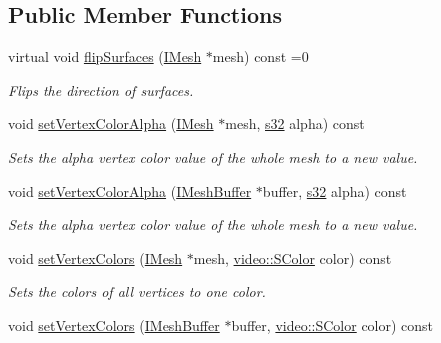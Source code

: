 \subsection*{Public Member Functions}
\begin{DoxyCompactItemize}
\item 
virtual void \hyperlink{classirr_1_1scene_1_1IMeshManipulator_a7194e8a44bfe3a6444826f346c4104ff}{flip\+Surfaces} (\hyperlink{classirr_1_1scene_1_1IMesh}{I\+Mesh} $\ast$mesh) const =0
\begin{DoxyCompactList}\small\item\em Flips the direction of surfaces. \end{DoxyCompactList}\item 
void \hyperlink{classirr_1_1scene_1_1IMeshManipulator_a96391fbe81aaddf8afa56b5b13da66e2}{set\+Vertex\+Color\+Alpha} (\hyperlink{classirr_1_1scene_1_1IMesh}{I\+Mesh} $\ast$mesh, \hyperlink{namespaceirr_ac66849b7a6ed16e30ebede579f9b47c6}{s32} alpha) const
\begin{DoxyCompactList}\small\item\em Sets the alpha vertex color value of the whole mesh to a new value. \end{DoxyCompactList}\item 
void \hyperlink{classirr_1_1scene_1_1IMeshManipulator_af69cbfcfd9286ccec2c6088a09dbe4a3}{set\+Vertex\+Color\+Alpha} (\hyperlink{classirr_1_1scene_1_1IMeshBuffer}{I\+Mesh\+Buffer} $\ast$buffer, \hyperlink{namespaceirr_ac66849b7a6ed16e30ebede579f9b47c6}{s32} alpha) const
\begin{DoxyCompactList}\small\item\em Sets the alpha vertex color value of the whole mesh to a new value. \end{DoxyCompactList}\item 
void \hyperlink{classirr_1_1scene_1_1IMeshManipulator_a72bc31cb9468480698277f0f164e71ee}{set\+Vertex\+Colors} (\hyperlink{classirr_1_1scene_1_1IMesh}{I\+Mesh} $\ast$mesh, \hyperlink{classirr_1_1video_1_1SColor}{video\+::\+S\+Color} color) const
\begin{DoxyCompactList}\small\item\em Sets the colors of all vertices to one color. \end{DoxyCompactList}\item 
void \hyperlink{classirr_1_1scene_1_1IMeshManipulator_ab13881bea577e0f0ffc03b102f29db6a}{set\+Vertex\+Colors} (\hyperlink{classirr_1_1scene_1_1IMeshBuffer}{I\+Mesh\+Buffer} $\ast$buffer, \hyperlink{classirr_1_1video_1_1SColor}{video\+::\+S\+Color} color) const

\end{DoxyCompactItemize}

